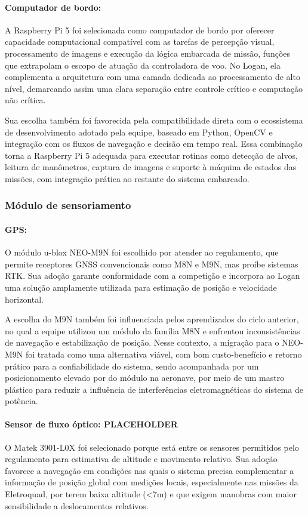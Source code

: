 \paragraph{Computador de bordo:}
A Raspberry Pi 5 foi selecionada como computador de bordo por oferecer capacidade computacional compatível com as tarefas de percepção visual, processamento de imagens e execução da lógica embarcada de missão, funções que extrapolam o escopo de atuação da controladora de voo. No Logan, ela complementa a arquitetura com uma camada dedicada ao processamento de alto nível, demarcando assim uma clara separação entre controle crítico e computação não crítica.

Sua escolha também foi favorecida pela compatibilidade direta com o ecossistema de desenvolvimento adotado pela equipe, baseado em Python, OpenCV e integração com os fluxos de navegação e decisão em tempo real. Essa combinação torna a Raspberry Pi 5 adequada para executar rotinas como detecção de alvos, leitura de manômetros, captura de imagens e suporte à máquina de estados das missões, com integração prática ao restante do sistema embarcado.

\subsubsection{Módulo de sensoriamento}

\paragraph{GPS:}
O módulo u-blox NEO-M9N foi escolhido por atender ao regulamento, que permite receptores GNSS convencionais como M8N e M9N, mas proíbe sistemas RTK. Sua adoção garante conformidade com a competição e incorpora ao Logan uma solução amplamente utilizada para estimação de posição e velocidade horizontal.

A escolha do M9N também foi influenciada pelos aprendizados do ciclo anterior, no qual a equipe utilizou um módulo da família M8N e enfrentou inconsistências de navegação e estabilização de posição. Nesse contexto, a migração para o NEO-M9N foi tratada como uma alternativa viável, com bom custo-benefício e retorno prático para a confiabilidade do sistema, sendo acompanhada por um posicionamento elevado por do módulo na aeronave, por meio de um mastro plástico para reduzir a influência de interferências eletromagnéticas do sistema de potência.

\paragraph{Sensor de fluxo óptico: PLACEHOLDER}
O Matek 3901-L0X foi selecionado porque está entre os sensores permitidos pelo regulamento para estimativa de altitude e movimento relativo. Sua adoção favorece a navegação em condições nas quais o sistema precisa complementar a informação de posição global com medições locais, especialmente nas missões da Eletroquad, por terem baixa altitude (<7m) e que exigem manobras com maior sensibilidade a deslocamentos relativos.

